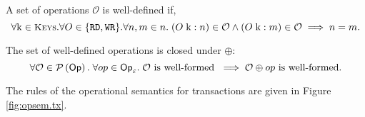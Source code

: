 \begin{definition}
\label{def:ops.welldefined}
A set of operations $\mathcal{O}$ is well-defined if, 
\[
\forall \key{k} \in \Addr.\forall O \in \{\RD, \WR\}. \forall n,m \in \nat.\; (O \;\key{k}: n) \in \mathcal{O} \wedge (O\; \key{k}: m) \in \mathcal{O}
\implies n = m.
\] 
\end{definition}

\begin{lemma}
\label{lem:wellformedops.closed}
The set of well-defined operations is closed under $\oplus$: 
\[ \forall \mathcal{O} \in \mathcal{P}\left(\mathsf{Op}\right).\; \forall op \in \mathsf{Op}_{\varepsilon}.\; \mathcal{O} \text{ is well-formed } 
\implies \mathcal{O} \oplus op \text{ is well-formed.}
\]
\end{lemma}

The rules of the operational semantics for transactions are given in Figure \ref{fig:opsem.tx}.

